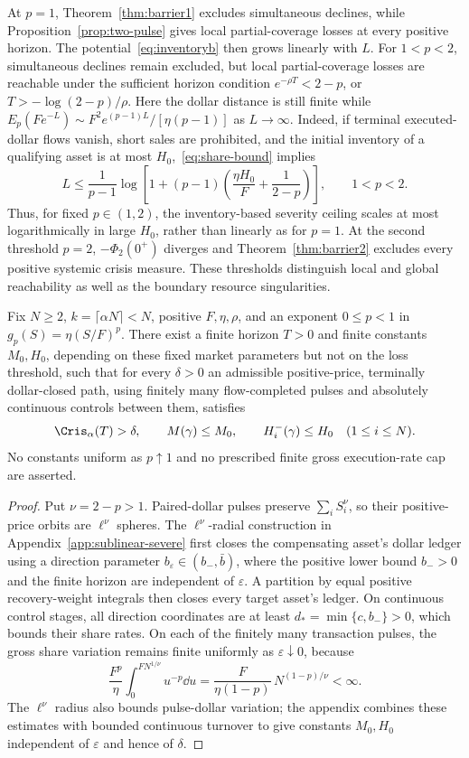\documentclass[review,hidelinks,onefignum,onetabnum]{siamonline250211}
\begin{document}
At $p=1$, Theorem~\ref{thm:barrier1} excludes simultaneous declines,
while Proposition~\ref{prop:two-pulse} gives local partial-coverage
losses at every positive horizon. The potential~\eqref{eq:inventoryb}
then grows linearly with $L$. For $1<p<2$, simultaneous declines
remain excluded, but local partial-coverage losses are reachable
under the sufficient horizon condition
$e^{-\rho T}<2-p$, or $T>-\log(2-p)/\rho$.
Here the dollar distance is still finite while
$E_p(Fe^{-L})\sim F^2e^{(p-1)L}/[\eta(p-1)]$ as $L\to\infty$.
Indeed, if terminal executed-dollar flows vanish, short sales
are prohibited, and the initial inventory of a qualifying asset
is at most $H_0$,~\eqref{eq:share-bound} implies
\[
L\le\frac{1}{p-1}\log\!\left[
1+(p-1)\left(\frac{\eta H_0}{F}+\frac{1}{2-p}\right)
\right],\qquad 1<p<2.
\]
Thus, for fixed $p\in(1,2)$, the inventory-based severity
ceiling scales at most logarithmically in large $H_0$, rather than
linearly as for $p=1$. At the second threshold $p=2$,
$-\Phi_2(0^+)$ diverges and Theorem~\ref{thm:barrier2}
excludes every positive systemic crisis measure. These thresholds distinguish local and global reachability as well
as the boundary resource singularities.


\begin{theorem}\label{thm:sublinear-severe}
Fix $N\ge2$, $k=\lceil\alpha N\rceil<N$, positive $F,\eta,\rho$,
and an exponent $0\le p<1$ in
$g_p(S)=\eta(S/F)^p$. There exist a finite horizon $T>0$
and finite constants $M_0,H_0$, depending on these fixed
market parameters but not on the loss threshold, such that for
every $\delta>0$ an admissible positive-price,
terminally dollar-closed path, using finitely many
flow-completed pulses and absolutely continuous controls
between them, satisfies
\[
\Cris_\alpha(T)>\delta,\qquad
M(\gamma)\le M_0,\qquad
H_i^-(\gamma)\le H_0\quad(1\le i\le N).
\]
No constants uniform as $p\uparrow1$ and no prescribed
finite gross execution-rate cap are asserted.
\end{theorem}
\begin{proof}
Put $\nu=2-p>1$. Paired-dollar pulses preserve
$\sum_iS_i^\nu$, so their positive-price orbits are
$\ell^\nu$ spheres. The $\ell^\nu$-radial construction in
Appendix~\ref{app:sublinear-severe} first closes the
compensating asset's dollar ledger using a direction
parameter $b_\varepsilon\in(b_-,\bar b)$, where the
positive lower bound $b_->0$ and the finite horizon
are independent of $\varepsilon$. A partition by equal
positive recovery-weight integrals then closes every
target asset's ledger. On continuous control stages,
all direction coordinates are at least
$d_*=\min\{c,b_-\}>0$, which bounds their share rates.
On each of the finitely many transaction pulses,
the gross share variation remains finite uniformly
as $\varepsilon\downarrow0$, because
\[
\frac{F^p}{\eta}\int_0^{FN^{1/\nu}}u^{-p}\dd u
=\frac{F}{\eta(1-p)}\,N^{(1-p)/\nu}<\infty.
\]
The $\ell^\nu$ radius also bounds pulse-dollar variation;
the appendix combines these estimates with bounded
continuous turnover to give constants $M_0,H_0$
independent of $\varepsilon$ and hence of $\delta$.
\end{proof}
\end{document}

